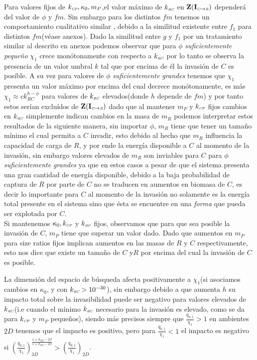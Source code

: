 Para valores fijos de $k_{\textit{\tiny CP}}, \kappa_0 ,m_P$,el valor m\'aximo de $k_{\textit{\tiny RC}}$ en $\mathbf{Z(I_{\textit{\tiny C}\to \textit{\tiny R}})}$ depender\'a del valor de $\phi$ y $fm$. Sin embargo para los distintos $fm$ tenemos un comportamiento cualitativo similar , debido a la similitud existente entre $f_1$ para distintos $fm$(v\'ease anexos). Dado la similitud entre $g$ y $f_1$ por un tratamiento similar al descrito en anexos podemos observar que para $\phi$ \emph{suficientemente peque\~no} $\chi_1$ crece mon\'otonamente con respecto a $k_{\textit{\tiny RC}}$ por lo tanto se observa la presencia de un valor umbral $k$ tal que por encima de \'el la invasi\'on de $C$ es posible. A su vez para valores de $\phi$ \emph{suficientemente grandes} tenemos que $\chi_1$ presenta un valor m\'aximo por encima del cual decrece mon\'otonamente, es m\'as $\chi_1 \approx c k_{RC}^{h - \phi}$ para valores de $k_{\textit{\tiny RC}}$ elevados(donde $h$ depende de $fm$) y por tanto estos ser\'ian exclu\'idos de $\mathbf{Z(I_{\textit{\tiny C}\to \textit{\tiny R}})}$ dado que al mantener $m_P$ y $k_{\textit{\tiny CP}}$ fijos cambios en $k_{\textit{\tiny RC}}$ simplemente indican cambios en la masa de $m_R$ podemos interpretar estos resultados de la siguiente manera, sin importar $\phi$, $m_R$ tiene que tener un tama\~no m\'inimo el cual permita a $C$ invadir, esto debido al hecho que $m_R$ influencia la capacidad de carga de $R$, y por ende la energ\'ia disponible a $C$ al momento de la invasi\'on, sin embargo valores elevados de $m_R$ son inviables para $C$ para $\phi$ \emph{suficientemente grandes} ya que en estos casos a pesar de que el sistema presenta una gran cantidad de energ\'ia disponible, debido a la baja probabilidad de captura de $R$ por parte de $C$ no se traducen en aumentos en biomasa de $C$, es decir lo importante para $C$ al momento de la invasi\'on no solamente es la energ\'ia total presente en el sistema sino que \'esta se encuentre en una \emph{forma} que pueda ser explotada por $C$.\\


Si mantenemos $\kappa_0,k_{\textit{\tiny CP}}$ y $k_{\textit{\tiny RP}}$ fijos, observamos que para que sea posible la invasi\'on de $C$, $m_P$ tiene que superar un valor dado. Dado que aumentos en $m_P$ para size ratios fijos implican aumentos en las masas de $R$ y $C$ respectivamente, esto nos dice que existe un tama\~no de $C$ y$R$ por encima del cual la invasi\'on de $C$ es posible.

La dimensi\'on del espacio de b\'usqueda afecta positivamente a $\chi_1$(si asociamos cambios en $\kappa_0$, y con $k_{\textit{\tiny RC}} > 10^{-30}$), sin embargo debido a que aumenta $h$ su impacto total sobre la invasibilidad puede ser negativo para valores elevados de $k_{\textit{\tiny RC}}$(i.e cuando el m\'inimo $k_{\textit{\tiny RC}}$ necesario para la invasi\'on es elevado, como se da para $k_{\textit{\tiny CP}}$ y $m_P$ peque\~nos), siendo m\'as precisos siempre que $\frac{q_{0,1}}{\chi_1} >1$ en ambientes $2D$ tenemos que el impacto es positivo, pero para $\frac{q_{0,1}}{\chi_1} < 1$ el impacto es negativo si $ (\frac{q_{0,1}}{\chi_1})_{3D}^\frac{1 + h_{2D} - 2 \beta}{1 + h_{3D} - 2 \beta} >  (\frac{q_{0,1}}{\chi_1})_{2D} $.\\


